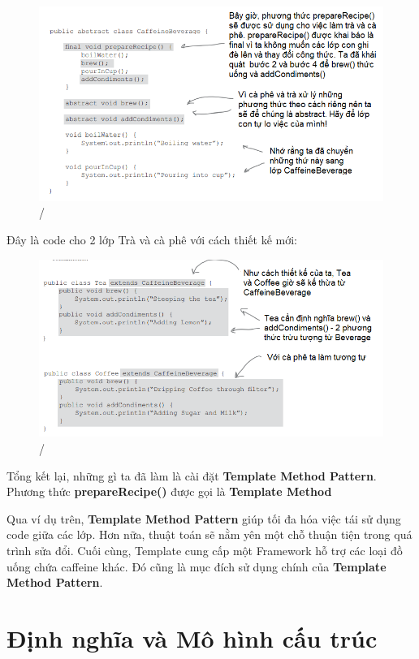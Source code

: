 \begin{figure}[!htb]
    \centering
    \includegraphics[width=\textwidth]{fig/Template/CaffeineBeverage.png}/
\end{figure}

Đây là code cho 2 lớp Trà và cà phê với cách thiết kế mới:
\begin{figure}[!htb]
    \centering
    \includegraphics[width=\textwidth]{fig/Template/TeaAndCoffeeNewDesign.png}/
\end{figure}

Tổng kết lại, những gì ta đã làm là cài đặt \textbf{Template Method Pattern}. Phương thức \textbf{prepareRecipe()} được gọi là \textbf{Template Method}\smallskip

Qua ví dụ trên, \textbf{Template Method Pattern} giúp tối đa hóa việc tái sử dụng code giữa các lớp. Hơn nữa, thuật toán sẽ nằm yên một chỗ thuận tiện trong quá trình sửa đổi. Cuối cùng, Template cung cấp một Framework hỗ trợ các loại đồ uống chứa caffeine khác. Đó cũng là mục đích sử dụng chính của \textbf{Template Method Pattern}.

\newpage
\section{Định nghĩa và Mô hình cấu trúc}

